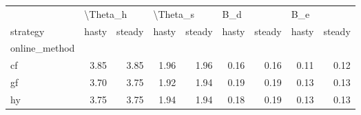 \begin{tabular}{lrrrrrrrr}
\toprule
{} & \multicolumn{2}{l}{\textbackslash Theta\_h} & \multicolumn{2}{l}{\textbackslash Theta\_s} & \multicolumn{2}{l}{B\_d} & \multicolumn{2}{l}{B\_e} \\
strategy &    hasty & steady &    hasty & steady & hasty & steady & hasty & steady \\
online\_method &          &        &          &        &       &        &       &        \\
\midrule
cf            &     3.85 &   3.85 &     1.96 &   1.96 &  0.16 &   0.16 &  0.11 &   0.12 \\
gf            &     3.70 &   3.75 &     1.92 &   1.94 &  0.19 &   0.19 &  0.13 &   0.13 \\
hy            &     3.75 &   3.75 &     1.94 &   1.94 &  0.18 &   0.19 &  0.13 &   0.13 \\
\bottomrule
\end{tabular}

